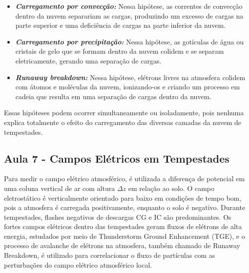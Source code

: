 \documentclass[a4paper, 12pt, onecolumn,singlespacing]{article}
\begin{document}
	\begin{itemize}
		\item \textbf{\textit{Carregamento por convecção:}} Nessa hipótese, as correntes de convecção dentro da nuvem separariam as cargas, produzindo um excesso de cargas na parte superior e uma deficiência de cargas na parte inferior da nuvem.
		
		\item \textbf{\textit{Carregamento por precipitação:}} Nessa hipótese, as gotículas de água ou cristais de gelo que se formam dentro da nuvem colidem e se separam eletricamente, gerando uma separação de cargas.
		
		\item \textbf{\textit{Runaway breakdown:}} Nessa hipótese, elétrons livres na atmosfera colidem com átomos e moléculas da nuvem, ionizando-os e criando um processo em cadeia que resulta em uma separação de cargas dentro da nuvem.
	\end{itemize}

	
	Essas hipóteses podem ocorrer simultaneamente ou isoladamente, pois nenhuma explica totalmente o efeito do carregamento das diversas camadas da nuvem de tempestades.
	
	\subsection{Aula 7 - Campos Elétricos em Tempestades}
	
	Para medir o campo elétrico atmosférico, é utilizada a diferença de potencial em uma coluna vertical de ar com altura $\Delta z$ em relação ao solo. O campo eletrostático é verticalmente orientado para baixo em condições de tempo bom, pois a atmosfera é carregada positivamente, enquanto o solo é negativo. Durante tempestades, flashes negativos de descargas CG e IC são predominantes. Os fortes campos elétricos dentro das tempestades geram fluxos de elétrons de alta energia, estudados por meio de Thunderstorm Ground Enhancement (TGE), e o processo de avalanche de elétrons na atmosfera, também chamado de Runaway Breakdown, é utilizado para correlacionar o fluxo de partículas com as perturbações do campo elétrico atmosférico local.
	
\end{document}
